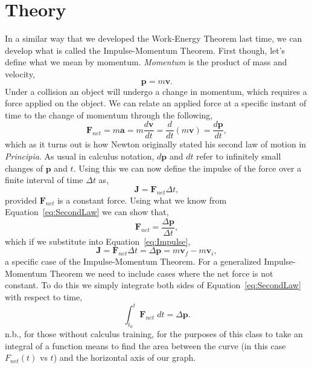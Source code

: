 \documentclass[main.tex]{subfiles}
\begin{document}
\section*{Theory}
In a similar way that we developed the Work-Energy Theorem last time, we can develop what is called the Impulse-Momentum Theorem. First though, let's define what we mean by momentum. \emph{Momentum} is the product of mass and velocity,
\begin{equation} \label{eq:momentum}
\mathbf{p}=m\mathbf{v}.
\end{equation}
Under a collision an object will undergo a change in momentum, which requires a force applied on the object. We can relate an applied force at a specific instant of time to the change of momentum through the following,
\begin{equation} \label{eq:SecondLaw}
\mathbf{F}_{net}=m\mathbf{a}=m\frac{d\mathbf{v}}{dt}=\frac{d}{dt}(m\mathbf{v})=\frac{d\mathbf{p}}{dt},
\end{equation}
which as it turns out is how Newton originally stated his second law of motion in \emph{Principia}. As usual in calculus notation, $d\mathbf{p}$ and $dt$ refer to infinitely small changes of $\mathbf{p}$ and $t.$ Using this we can now define the impulse of the force over a finite interval of time $\Delta t$ as,
\begin{equation} \label{eq:Impulse}
\mathbf{J}=\mathbf{F}_{net}\Delta t,
\end{equation}
provided $\mathbf{F}_{net}$ is a constant force. Using what we know from Equation~\eqref{eq:SecondLaw} we can show that,
\[
\mathbf{F}_{net}=\frac{\Delta\mathbf{p}}{\Delta t},
\]
which if we substitute into Equation~\eqref{eq:Impulse}, 
\begin{equation} \label{eq:AlgIMT}
\mathbf{J}=\mathbf{F}_{net}\Delta t=\Delta\mathbf{p}=m\mathbf{v}_f-m\mathbf{v}_i,
\end{equation}
a specific case of the Impulse-Momentum Theorem. For a generalized Impulse-Momentum Theorem we need to include cases where the net force is not constant. To do this we simply integrate both sides of Equation~\eqref{eq:SecondLaw} with respect to time,
\begin{equation} \label{eq:CalcIMT}
\int_{t_0}^{t}\mathbf{F}_{net}\;dt=\Delta\mathbf{p}.
\end{equation}
n.b., for those without calculus training, for the purposes of this class to take an integral of a function means to find the area between the curve (in this case $F_{net}(t)$ vs $t$) and the horizontal axis of our graph.
\end{document}
